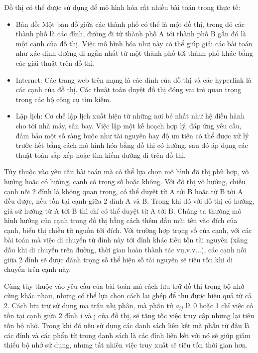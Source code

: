 \documentclass{hust}
\begin{document}
Đồ thị có thể được sử dụng để mô hình hóa rất nhiều bài toán trong thực tế: \cite{sedgewick2011algorithms}
\begin{itemize}
	\item Bản đồ: Một bản đồ giữa các thành phố có thể là một đồ thị, trong đó các thành phố là các đỉnh, đường đi từ thành phố A tới thành phố B gần đó là một cạnh của đồ thị. Việc mô hình hóa như này có thể giúp giải các bài toán như xác định đường đi ngắn nhất từ một thành phố tới thành phố khác bằng các giải thuật trên đồ thị.
	\item Internet: Các trang web trên mạng là các đỉnh của đồ thị và các hyperlink là các cạnh của đồ thị. Các thuật toán duyệt đồ thị đóng vai trò quan trọng trong các bộ công cụ tìm kiếm.
	\item Lập lịch: Cơ chế lập lịch xuất hiện từ những nơi bé nhất như hệ điều hành cho tới nhà máy, sân bay. Việc lập một kế hoạch hợp lý, đáp ứng yêu cầu, đảm bảo một số ràng buộc như tài nguyên hay độ ưu tiên có thể được xử lý trước hết bằng cách mô hình hóa bằng đồ thị có hướng, sau đó áp dụng các thuật toán sắp xếp hoặc tìm kiếm đường đi trên đồ thị.
\end{itemize}
Tùy thuộc vào yêu cầu bài toán mà có thể lựa chọn mô hình đồ thị phù hợp, vô hướng hoặc có hướng, cạnh có trọng số hoặc không. Với đồ thị vô hướng, chiều cạnh nối 2 đỉnh là không quan trọng, có thể duyệt từ A tới B hoặc từ B tới A đều được, nếu tồn tại cạnh giữa 2 đỉnh A và B. Trong khi đó với đồ thị có hướng, giả sử hướng từ A tới B thì chỉ có thể duyệt từ A tới B. Chúng ta thường mô hình hướng của cạnh trong đồ thị bằng cách thêm dẫu mũi tên vào đích của cạnh, biểu thị chiều từ nguồn tới đích. Với trường hợp trọng số của cạnh, với các bài toán mà việc di chuyển từ đỉnh này tới đỉnh khác tiêu tốn tài nguyên (xăng dầu khi di chuyển trên đường, thời gian hoàn thành tác vụ,v.v...), các cạnh nối giữa 2 đỉnh sẽ được đánh trọng số thể hiện số tài nguyên sẽ tiêu tốn khi di chuyển trên cạnh này.


Cùng tùy thuộc vào yêu cầu của bài toán mà cách lưu trữ đồ thị trong bộ nhớ cũng khác nhau, nhưng có thể lựa chọn cách lai ghép để thu được hiệu quả từ cả 2. Cách lưu trữ sử dụng ma trận nhị phân, mà phần tử $a_{ij}$ là 0 hoặc 1 chỉ việc có tồn tại cạnh giữa 2 đỉnh i và j của đồ thị, sẽ tăng tốc việc truy cập nhưng lại tiêu tốn bộ nhớ. Trong khi đó nếu sử dụng các danh sách liên kết mà phần từ đầu là các đỉnh và các phẩn từ trong danh sách là các đỉnh liên kết với nó sẽ giúp giảm thiểu bộ nhớ sử dụng, nhưng tất nhiên việc truy xuất sẽ tiêu tốn thời gian hơn.
\end{document}
